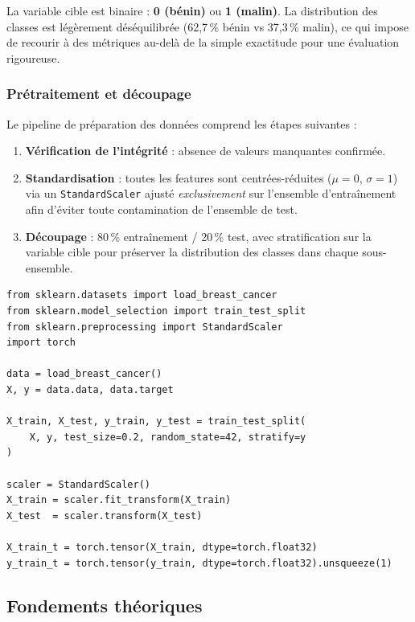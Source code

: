 \documentclass[11pt,a4paper]{article}
\begin{document}
La variable cible est binaire : \textbf{0 (bénin)} ou \textbf{1 (malin)}.
La distribution des classes est légèrement déséquilibrée (62,7\,\% bénin vs
37,3\,\% malin), ce qui impose de recourir à des métriques au-delà de la simple
exactitude pour une évaluation rigoureuse.

\subsubsection{Prétraitement et découpage}

Le pipeline de préparation des données comprend les étapes suivantes :

\begin{enumerate}
  \item \textbf{Vérification de l'intégrité} : absence de valeurs manquantes confirmée.
  \item \textbf{Standardisation} : toutes les features sont centrées-réduites
        ($\mu = 0$, $\sigma = 1$) via un \texttt{StandardScaler} ajusté
        \textit{exclusivement} sur l'ensemble d'entraînement afin d'éviter toute
        contamination de l'ensemble de test.
  \item \textbf{Découpage} : 80\,\% entraînement / 20\,\% test, avec stratification
        sur la variable cible pour préserver la distribution des classes dans chaque sous-ensemble.
\end{enumerate}

\begin{lstlisting}[caption={Chargement et prétraitement du dataset Breast Cancer.},
                   label={lst:data_prep}]
from sklearn.datasets import load_breast_cancer
from sklearn.model_selection import train_test_split
from sklearn.preprocessing import StandardScaler
import torch

data = load_breast_cancer()
X, y = data.data, data.target

X_train, X_test, y_train, y_test = train_test_split(
    X, y, test_size=0.2, random_state=42, stratify=y
)

scaler = StandardScaler()
X_train = scaler.fit_transform(X_train)
X_test  = scaler.transform(X_test)

X_train_t = torch.tensor(X_train, dtype=torch.float32)
y_train_t = torch.tensor(y_train, dtype=torch.float32).unsqueeze(1)
\end{lstlisting}

\subsection{Fondements théoriques}
\end{document}
